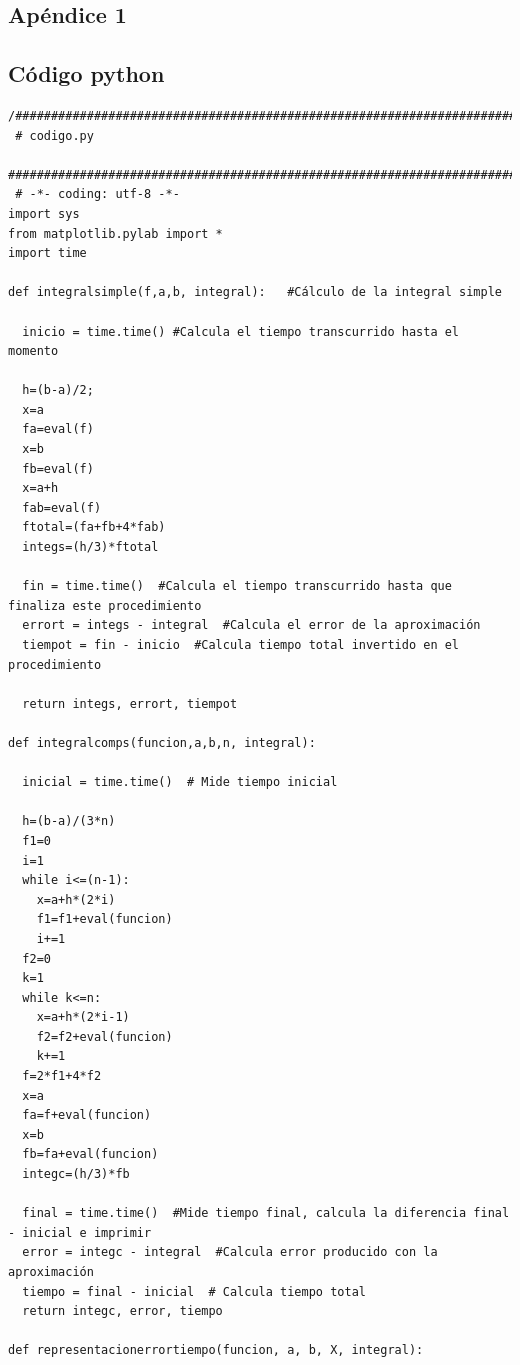 \documentclass[spanish,a4paper,11pt]{report}
\begin{document}
\begin{appendix}

\chapter{Apéndice 1}
\label{appendix:1}


\section{Código python}
\label{Apendice1:YYY}

\begin{center}
\begin{footnotesize}
\begin{verbatim}
/###################################################################################
 # codigo.py
 ###################################################################################
 # -*- coding: utf-8 -*-
import sys
from matplotlib.pylab import *
import time

def integralsimple(f,a,b, integral):   #Cálculo de la integral simple

  inicio = time.time() #Calcula el tiempo transcurrido hasta el momento
  
  h=(b-a)/2;
  x=a
  fa=eval(f)
  x=b
  fb=eval(f)
  x=a+h
  fab=eval(f)
  ftotal=(fa+fb+4*fab)
  integs=(h/3)*ftotal
  
  fin = time.time()  #Calcula el tiempo transcurrido hasta que finaliza este procedimiento
  errort = integs - integral  #Calcula el error de la aproximación
  tiempot = fin - inicio  #Calcula tiempo total invertido en el procedimiento
  
  return integs, errort, tiempot

def integralcomps(funcion,a,b,n, integral):

  inicial = time.time()  # Mide tiempo inicial
  
  h=(b-a)/(3*n)
  f1=0
  i=1
  while i<=(n-1):
    x=a+h*(2*i)
    f1=f1+eval(funcion)
    i+=1
  f2=0
  k=1
  while k<=n:
    x=a+h*(2*i-1)
    f2=f2+eval(funcion)
    k+=1
  f=2*f1+4*f2
  x=a
  fa=f+eval(funcion)
  x=b
  fb=fa+eval(funcion)
  integc=(h/3)*fb
  
  final = time.time()  #Mide tiempo final, calcula la diferencia final - inicial e imprimir
  error = integc - integral  #Calcula error producido con la aproximación
  tiempo = final - inicial  # Calcula tiempo total
  return integc, error, tiempo

def representacionerrortiempo(funcion, a, b, X, integral):


\end{verbatim}
\end{footnotesize}
\end{center}
\end{appendix}
\end{document}
